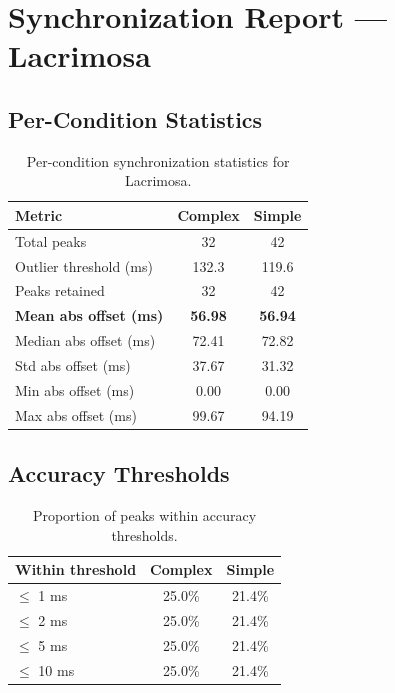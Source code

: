 
\section*{Synchronization Report --- Lacrimosa}

\subsection*{Per-Condition Statistics}

\begin{table}[h!]
\centering
\begin{tabular}{|l|c|c|}
\hline
Metric & Complex & Simple \\
\hline
Total peaks & 32 & 42 \\
Outlier threshold (ms) & 132.3 & 119.6 \\
Peaks retained & 32 & 42 \\
\textbf{Mean abs offset (ms)} & \textbf{56.98} & \textbf{56.94} \\
Median abs offset (ms) & 72.41 & 72.82 \\
Std abs offset (ms) & 37.67 & 31.32 \\
Min abs offset (ms) & 0.00 & 0.00 \\
Max abs offset (ms) & 99.67 & 94.19 \\
\hline
\end{tabular}
\caption{Per-condition synchronization statistics for Lacrimosa.}
\label{tab:sync_stats}
\end{table}

\subsection*{Accuracy Thresholds}

\begin{table}[h!]
\centering
\begin{tabular}{|l|c|c|}
\hline
Within threshold & Complex & Simple \\
\hline
$\leq$ 1 ms & 25.0\% & 21.4\% \\
$\leq$ 2 ms & 25.0\% & 21.4\% \\
$\leq$ 5 ms & 25.0\% & 21.4\% \\
$\leq$ 10 ms & 25.0\% & 21.4\% \\
\hline
\end{tabular}
\caption{Proportion of peaks within accuracy thresholds.}
\label{tab:sync_accuracy}
\end{table}

